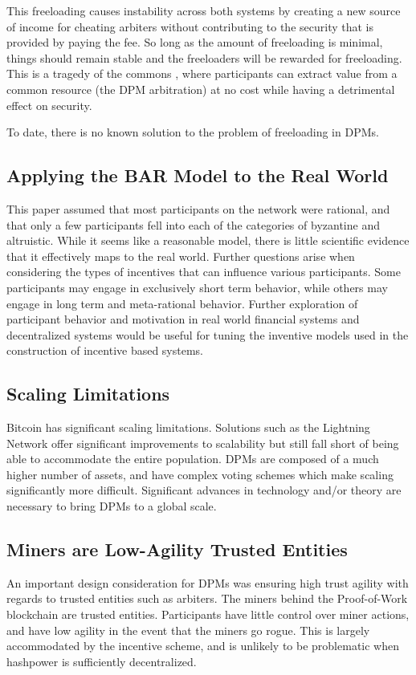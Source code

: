 \documentclass[onecolumn]{article}
\begin{document}
This freeloading causes instability across both systems by creating a new source of income for cheating arbiters without contributing to the security that is provided by paying the fee.
So long as the amount of freeloading is minimal, things should remain stable and the freeloaders will be rewarded for freeloading.
This is a tragedy of the commons \cite{totc}, where participants can extract value from a common resource (the DPM arbitration) at no cost while having a detrimental effect on security.

To date, there is no known solution to the problem of freeloading in DPMs.

\subsection{Applying the BAR Model to the Real World}
This paper assumed that most participants on the network were rational, and that only a few participants fell into each of the categories of byzantine and altruistic.
While it seems like a reasonable model, there is little scientific evidence that it effectively maps to the real world.
Further questions arise when considering the types of incentives that can influence various participants.
Some participants may engage in exclusively short term behavior, while others may engage in long term and meta-rational behavior.
Further exploration of participant behavior and motivation in real world financial systems and decentralized systems would be useful for tuning the inventive models used in the construction of incentive based systems.

\subsection{Scaling Limitations}
Bitcoin has significant scaling limitations.
Solutions such as the Lightning Network \cite{lightning} offer significant improvements to scalability but still fall short of being able to accommodate the entire population.
DPMs are composed of a much higher number of assets, and have complex voting schemes which make scaling significantly more difficult.
Significant advances in technology and/or theory are necessary to bring DPMs to a global scale.

\subsection{Miners are Low-Agility Trusted Entities}
An important design consideration for DPMs was ensuring high trust agility with regards to trusted entities such as arbiters.
The miners behind the Proof-of-Work blockchain are trusted entities.
Participants have little control over miner actions, and have low agility in the event that the miners go rogue.
This is largely accommodated by the incentive scheme, and is unlikely to be problematic when hashpower is sufficiently decentralized.
\end{document}
